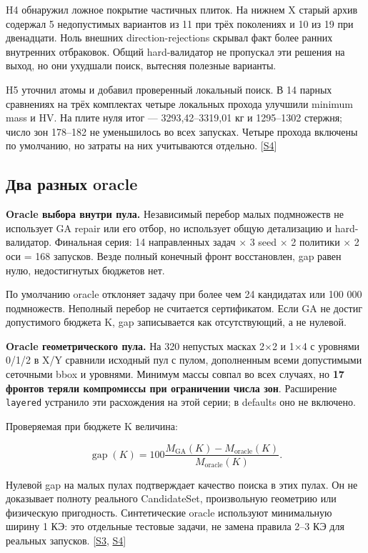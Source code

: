 \documentclass[11pt,a4paper]{article}
\begin{document}
H4 обнаружил ложное покрытие частичных плиток. На нижнем X старый архив содержал 5 недопустимых вариантов из 11 при трёх поколениях и 10 из 19 при двенадцати. Ноль внешних direction-rejections скрывал факт более ранних внутренних отбраковок. Общий hard-валидатор не пропускал эти решения на выход, но они ухудшали поиск, вытесняя полезные варианты.


H5 уточнил атомы и добавил проверенный локальный поиск. В 14 парных сравнениях на трёх комплектах четыре локальных прохода улучшили minimum mass и HV. На плите нуля итог — 3293,42–3319,01 кг и 1295–1302 стержня; число зон 178–182 не уменьшилось во всех запусках. Четыре прохода включены по умолчанию, но затраты на них учитываются отдельно. {\color{Teal}\small[\hyperlink{S4}{S4}]}


\subsection{Два разных oracle}

\textbf{Oracle выбора внутри пула.} Независимый перебор малых подмножеств не использует GA repair или его отбор, но использует общую детализацию и hard-валидатор. Финальная серия: 14 направленных задач × 3 seed × 2 политики × 2 оси = 168 запусков. Везде полный конечный фронт восстановлен, gap равен нулю, недостигнутых бюджетов нет.


По умолчанию oracle отклоняет задачу при более чем 24 кандидатах или 100 000 подмножеств. Неполный перебор не считается сертификатом. Если GA не достиг допустимого бюджета K, gap записывается как отсутствующий, а не нулевой.


\textbf{Oracle геометрического пула.} На 320 непустых масках 2×2 и 1×4 с уровнями 0/1/2 в X/Y сравнили исходный пул с пулом, дополненным всеми допустимыми сеточными bbox и уровнями. Минимум массы совпал во всех случаях, но \textbf{17 фронтов теряли компромиссы при ограничении числа зон}. Расширение {\small\nolinkurl{layered}} устранило эти расхождения на этой серии; в defaults оно не включено.


Проверяемая при бюджете K величина:


\[
\operatorname{gap}(K)=100\frac{M_{\mathrm{GA}}(K)-M_{\mathrm{oracle}}(K)}{M_{\mathrm{oracle}}(K)}.
\]

Нулевой gap на малых пулах подтверждает качество поиска в этих пулах. Он не доказывает полноту реального CandidateSet, произвольную геометрию или физическую пригодность. Синтетические oracle используют минимальную ширину 1 КЭ: это отдельные тестовые задачи, не замена правила 2–3 КЭ для реальных запусков. {\color{Teal}\small[\hyperlink{S3}{S3}, \hyperlink{S4}{S4}]}
\end{document}

